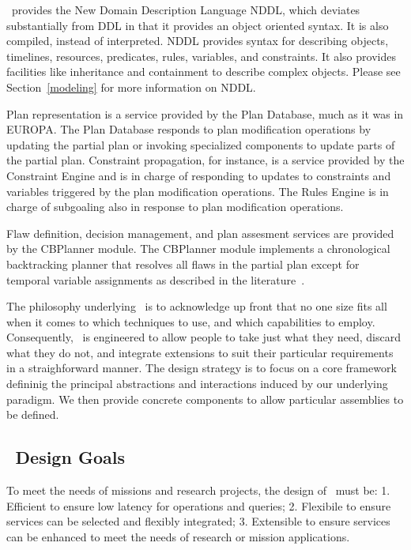 \documentclass[10pt, letterpaper, twoside]{article}
\begin{document}
\ET\, provides the New Domain Description Language NDDL, which deviates
substantially from DDL in that it provides an object oriented syntax.  It
is also compiled, instead of interpreted.  NDDL provides syntax for
describing objects, timelines, resources, predicates, rules, variables, and
constraints. It also provides facilities like inheritance and containment
to describe complex objects.  Please see Section~\ref{modeling} for more
information on NDDL. 

Plan representation is a service provided by the Plan Database, much as it
was in EUROPA.  The Plan Database responds to plan modification operations
by updating the partial plan or invoking specialized components to update
parts of the partial plan.  Constraint propagation, for instance, is a
service provided by the Constraint Engine and is in charge of responding to
updates to constraints and variables triggered by the plan modification
operations. The Rules Engine is in charge of subgoaling also in response to
plan modification operations. 

Flaw definition, decision management, and plan assesment services are
provided by the CBPlanner module. The CBPlanner module implements a
chronological backtracking planner that resolves all flaws in the partial
plan except for temporal variable assignments as described in the
literature~\cite{planid,europa2}.  

The philosophy underlying \ET\, is to acknowledge up front that no
one size fits all when it comes to which techniques to use, and which
capabilities to employ. Consequently, \ET\, is engineered to allow
people to take just what they need, discard what they do not, and
integrate extensions to suit their particular requirements in a
straighforward manner. The design strategy is to focus on a core
framework defininig the principal abstractions and interactions
induced by our underlying paradigm. We then provide concrete
components to allow particular assemblies to be defined. 

\subsection{\ET\, Design Goals}
\label{goals}
To meet the needs of missions and research projects, the design of 
\ET\, must be: 1. Efficient to ensure low latency for operations and
queries; 2. Flexibile to ensure services can be selected and flexibly
integrated; 3. Extensible to ensure services can be enhanced to meet the
needs of research or mission applications. 
\end{document}
